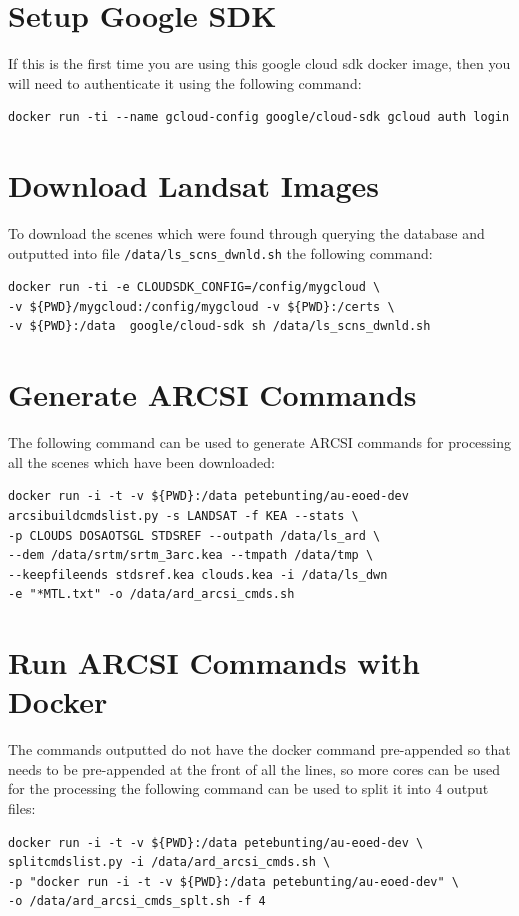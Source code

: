 \documentclass[authoryear, 11pt, oneside]{report}
\begin{document}
\section{Setup Google SDK}
If this is the first time you are using this google cloud sdk docker image, then you will need to authenticate it using the following command:
\begin{verbatim}
docker run -ti --name gcloud-config google/cloud-sdk gcloud auth login
\end{verbatim}

\section{Download Landsat Images}
To download the scenes which were found through querying the database and outputted into file \texttt{/data/ls_scns_dwnld.sh} the following command: 
\begin{verbatim}
docker run -ti -e CLOUDSDK_CONFIG=/config/mygcloud \
-v ${PWD}/mygcloud:/config/mygcloud -v ${PWD}:/certs \
-v ${PWD}:/data  google/cloud-sdk sh /data/ls_scns_dwnld.sh
\end{verbatim}

\section{Generate ARCSI Commands}
The following command can be used to generate ARCSI commands for processing all the scenes which have been downloaded:
\begin{verbatim}
docker run -i -t -v ${PWD}:/data petebunting/au-eoed-dev 
arcsibuildcmdslist.py -s LANDSAT -f KEA --stats \
-p CLOUDS DOSAOTSGL STDSREF --outpath /data/ls_ard \
--dem /data/srtm/srtm_3arc.kea --tmpath /data/tmp \
--keepfileends stdsref.kea clouds.kea -i /data/ls_dwn 
-e "*MTL.txt" -o /data/ard_arcsi_cmds.sh
\end{verbatim}

\section{Run ARCSI Commands with Docker}
The commands outputted do not have the docker command pre-appended so that needs to be pre-appended at the front of all the lines, so more cores can be used for the processing the following command can be used to split it into 4 output files:
\begin{verbatim}
docker run -i -t -v ${PWD}:/data petebunting/au-eoed-dev \
splitcmdslist.py -i /data/ard_arcsi_cmds.sh \
-p "docker run -i -t -v ${PWD}:/data petebunting/au-eoed-dev" \
-o /data/ard_arcsi_cmds_splt.sh -f 4
\end{verbatim}
\end{document}
